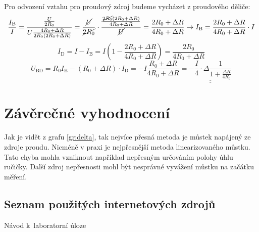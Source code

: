 \documentclass[a4paper,12pt]{article}   %
\begin{document}
Pro odvození vztahu pro proudový zdroj budeme vycházet z proudového děliče:
\begin{equation}
  \frac{I_\text{B}}{I} = \frac{\frac{U}{2R_0}}{U\frac{4R_0+\Delta R}{2R_0(2R_0 + \Delta R)}} = \frac{\cancel{U}}{\cancel{2R_0}}\cdot \frac{\frac{\cancel{2R_0}(2R_0 + \Delta R)}{{4R_0+\Delta R}}}{\cancel{U}} = \frac{2R_0+\Delta R}{4R_0 + \Delta R} \rightarrow I_\text{B} = {{\frac{2R_0+\Delta R}{4R_0 + \Delta R} \cdot I}}
\end{equation}
\begin{equation}
  I_\text{D} = I - I_\text{B} = I\left(1-\frac{2R_0+\Delta R}{4R_0 + \Delta R}\right) = {\frac{2R_0}{4R_0+\Delta R}}
\end{equation}
\begin{equation}
  U_\text{BD} = R_0 I_\text{B} -\left(R_0+\Delta R\right)\cdot I_\text{D} = -I\frac{R_0+\Delta R}{4R_0 + \Delta R} = \underline{\underline{-\frac{I}{4}\cdot\Delta \frac{1}{1+\frac{\Delta R}{4R_0}}}}
\end{equation}


\section{Závěrečné vyhodnocení}
Jak je vidět z grafu \ref{gr:delta}, tak nejvíce přesná metoda je můstek napájený ze zdroje proudu. Nicméně v praxi je nejpřesnější metoda linearizovaného můstku. Tato chyba mohla vzniknout například nepřesným určováním polohy úhlu ručičky. Další zdroj nepřesnosti mohl být nesprávné vyvážení můstku na začátku měření.

\clearpage
\renewcommand{\refname}{Seznam použité literatury a~zdrojů informací} 

\begin{thebibliography}{99}

\subsection*{Seznam použitých internetových zdrojů}
     Návod k~laboratorní úloze
    
\end{thebibliography}
\end{document}
